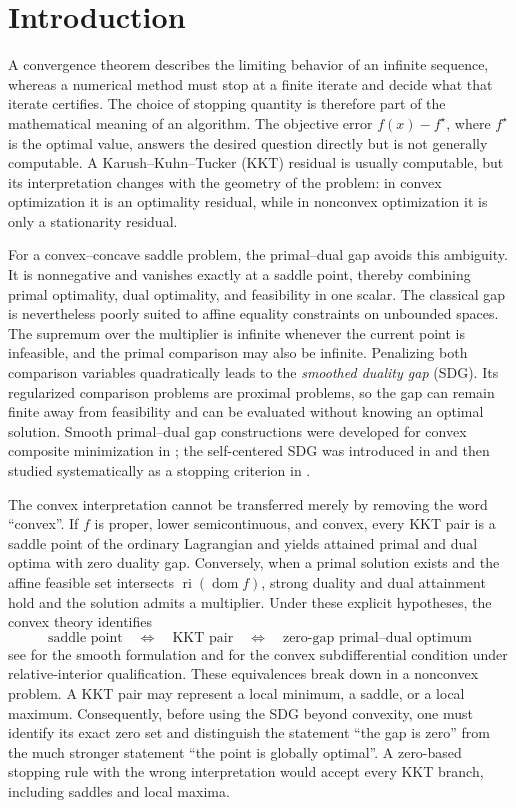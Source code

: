 \section{Introduction}
\label{sec:introduction}

A convergence theorem describes the limiting behavior of an infinite
sequence, whereas a numerical method must stop at a finite iterate and decide
what that iterate certifies.  The choice of stopping quantity is therefore
part of the mathematical meaning of an algorithm.  The objective error
\(f(x)-f^\star\), where \(f^\star\) is the optimal value, answers the desired
question directly but is not generally computable.  A
Karush--Kuhn--Tucker (KKT) residual is usually
computable, but its interpretation changes with the geometry of the problem:
in convex optimization it is an optimality residual, while in nonconvex
optimization it is only a stationarity residual.

For a convex--concave saddle problem, the primal--dual gap avoids this
ambiguity.  It is nonnegative and vanishes exactly at a saddle point, thereby
combining primal optimality, dual optimality, and feasibility in one scalar.
The classical gap is nevertheless poorly suited to affine equality
constraints on unbounded spaces.  The supremum over the multiplier is
infinite whenever the current point is infeasible, and the primal comparison
may also be infinite.  Penalizing both comparison variables quadratically
leads to the \emph{smoothed duality gap} (SDG).  Its regularized comparison
problems are proximal problems, so the gap can remain finite away from
feasibility and can be evaluated without knowing an optimal solution.
Smooth primal--dual gap constructions were developed for convex composite
minimization in \cite{TranDinhFercoqCevher2018}; the self-centered SDG was
introduced in \cite{Fercoq2023} and then studied systematically as a stopping
criterion in \cite{WalwilFercoq2025}.

The convex interpretation cannot be transferred merely by removing the word
``convex''.  If \(f\) is proper, lower semicontinuous, and convex, every KKT
pair is a saddle point of the ordinary Lagrangian and yields attained primal
and dual optima with zero duality gap.  Conversely, when a primal solution
exists and the affine feasible set intersects
\(\operatorname{ri}(\operatorname{dom}f)\), strong duality and dual attainment
hold and the solution admits a multiplier.
Under these explicit hypotheses, the convex theory identifies
\[
  \text{saddle point}
  \quad\Longleftrightarrow\quad
  \text{KKT pair}
  \quad\Longleftrightarrow\quad
  \text{zero-gap primal--dual optimum}
\]
see \citet[Sections~5.4.2 and~5.5.3]{BoydVandenberghe2004} for the smooth
formulation and \citet[Theorem~27.4]{Rockafellar1970} for the convex
subdifferential condition under relative-interior qualification.  These
equivalences break down in a nonconvex problem.  A KKT pair
may represent a local minimum, a saddle, or a local
maximum.  Consequently, before using the SDG beyond convexity, one must
identify its exact zero set and distinguish the statement ``the gap is zero''
from the much stronger statement ``the point is globally optimal''.  A
zero-based stopping rule with the wrong interpretation would accept every KKT
branch, including saddles and local maxima.

